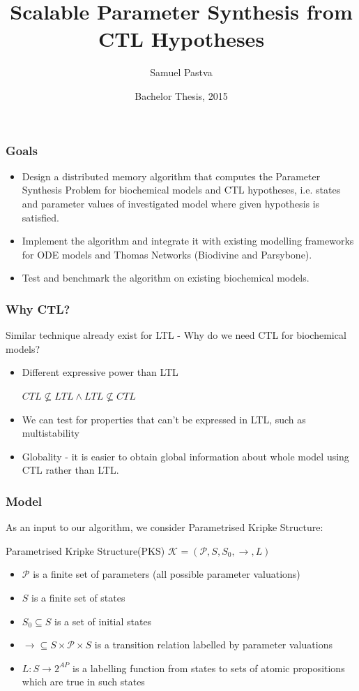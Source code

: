 \documentclass{beamer}
\title[Scalable Parameter Synthesis] %
{Scalable Parameter Synthesis from CTL Hypotheses}
\author[Pastva] %
{Samuel Pastva}
\institute[Masaryk University] %
{
	Masaryk University \\
	Brno
}
\date[2015] %
{Bachelor Thesis, 2015}
\newcommand{\ks}[1][]{\ensuremath{\mathcal{K}_{#1}}}
\newcommand{\fullKs}{\ensuremath{ \ks = (\params, S, S_0, \trans{}, L) }}
\newcommand{\trans}[1]{\stackrel{#1}{\rightarrow}}
\newcommand{\params}{\mathcal{P}}
\begin{document}
  \frame{\titlepage}
  \begin{frame}
    \frametitle{Goals}
		\begin{itemize}
			\item<1-> Design a distributed memory algorithm that computes the Parameter Synthesis Problem for biochemical models and CTL hypotheses, i.e. states and parameter values of investigated model where given hypothesis is satisfied.
			\item<2-> Implement the algorithm and integrate it with existing modelling frameworks for ODE models and Thomas Networks (Biodivine and Parsybone).
			\item<3-> Test and benchmark the algorithm on existing biochemical models.
		\end{itemize}
  \end{frame}
  \begin{frame}
    \frametitle{Why CTL?}
    Similar technique already exist for LTL - Why do we need CTL for biochemical models?
	\begin{itemize}
		\item<1-> Different expressive power than LTL		
				
			$CTL \not\subseteq LTL \wedge LTL \not\subseteq CTL$				
		\item<2-> We can test for properties that can't be expressed in LTL, such as multistability			  
		\item<3-> Globality - it is easier to obtain global information about whole model using CTL rather than LTL.
	\end{itemize}
  \end{frame}
  \begin{frame}
  	\frametitle{Model}
  	As an input to our algorithm, we consider Parametrised Kripke Structure:
  	\begin{block}{Parametrised Kripke Structure(PKS)}
  			$\fullKs$
			\begin{itemize}
				\item $\params$ is a finite set of parameters (all possible parameter valuations)
				\item $S$ is a finite set of states
				\item $S_0 \subseteq S$ is a set of initial states
				\item $\trans{} \subseteq S \times \params \times S$ is a transition relation labelled by parameter valuations 
				\item $L: S \rightarrow 2^{AP} $ is a labelling function from states to sets of atomic propositions which are true in such states
			\end{itemize}
	\end{block}
  \end{frame}
\end{document}
